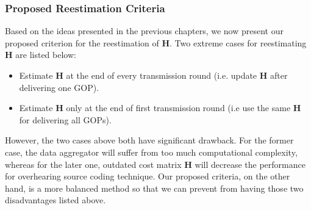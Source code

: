 {\subsubsection{Proposed Reestimation Criteria}
\label{sec::reestimationCriteria}
Based on the ideas presented in the previous chapters, we now present our proposed criterion for the reestimation of $\mathbf{H}$.
Two extreme cases for reestimating $\mathbf{H}$ are listed below:
\begin{itemize}
\item Estimate $\mathbf{H}$ at the end of every transmission round (i.e. update $\mathbf{H}$ after delivering one GOP).
\item Estimate $\mathbf{H}$ only at the end of first transmission round (i.e use the same $\mathbf{H}$ for delivering all GOPs).
\end{itemize}
However, the two cases above both have significant drawback.
For the former case, the data aggregator will suffer from too much computational complexity, whereas for the later one, outdated cost matrix $\mathbf{H}$ will decrease the performance for overhearing source coding technique.
Our proposed criteria, on the other hand, is a more balanced method so that we can prevent from having those two disadvantages listed above.

}

